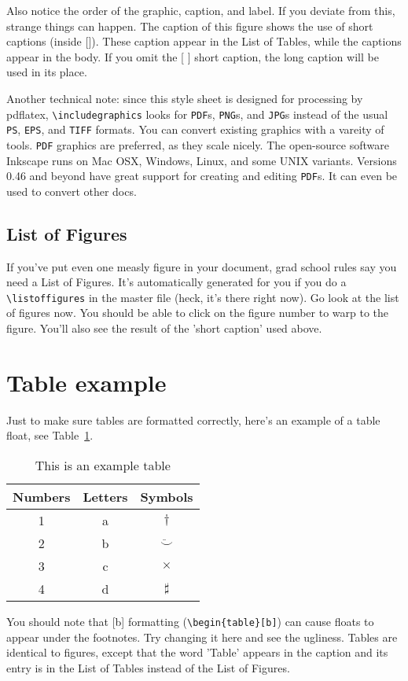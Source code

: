Also notice the order of the graphic, caption, and label.  If you deviate
from this, strange things can happen.  The caption of this figure shows the
use of short captions (inside []).  These caption appear in the List of
Tables, while the { } captions appear in the body.  If you omit the [ ]
short caption, the long caption will be used in its place.

Another technical note: since this style sheet is designed for processing
by pdflatex, {\verb"\includegraphics"} looks for \texttt{PDF}s,
\texttt{PNG}s, and \texttt{JPG}s instead of the usual \texttt{PS},
\texttt{EPS}, and \texttt{TIFF} formats.  You can convert existing graphics
with a vareity of tools.  \texttt{PDF} graphics are preferred, as they
scale nicely.  The open-source software Inkscape runs on Mac OSX, Windows,
Linux, and some \textsc{UNIX} variants.  Versions 0.46 and beyond have great
support for creating and editing \texttt{PDF}s.  It can even be used to
convert other docs.

\subsection{List of Figures}
If you've put even one measly figure in your document, grad school rules say
you need a List of Figures.  It's automatically generated for you if you do
a {\verb!\listoffigures!} in the master file (heck, it's there right now).
Go look at the list of figures now.  You should be able to click on the
figure number to warp to the figure.  You'll also see the result of the
'short caption' used above.


\section{Table example}

Just to make sure tables are formatted correctly, 
here's an example of a table float, see Table~\ref{tab:example}.
\begin{table}[t]
	\label{tab:example}
	\begin{center}
	\begin{tabular}{c|c|c}
			\hline
			Numbers & Letters & Symbols \\ \hline
			1 & a & $\dagger$ \\
			2 & b & $\ddot \smile$ \\
			3 & c & $\times$ \\
			4 & d & $\sharp$
	\end{tabular}
	\caption{This is an example table}
	\end{center}
\end{table}
You should note that [b] formatting 
({\verb!\begin{table}[b]!})
can cause floats to appear under the
footnotes.  Try changing it here and see the ugliness.  Tables are identical
to figures, except that the word 'Table' appears in the caption and its
entry is in the List of Tables instead of the List of Figures.

